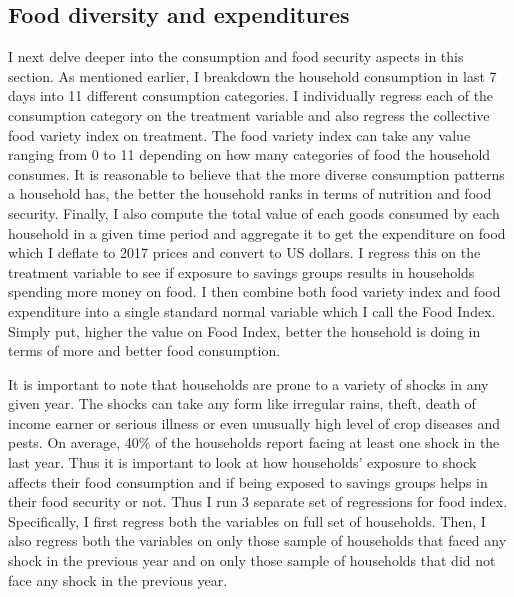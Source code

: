 \documentclass[12pt]{article}
\begin{document}
{\pagebreak
\clearpage

\subsection*{Food diversity and expenditures}\label{sec:regression food}

\hspace{1cm} I next delve deeper into the consumption and food security aspects in this section. As mentioned earlier, I breakdown the household consumption in last 7 days into 11 different consumption categories. I individually regress each of the consumption category on the treatment variable and also regress the collective food variety index on treatment. The food variety index can take any value ranging from 0 to 11 depending on how many categories of food the household consumes. It is reasonable to believe that the more diverse consumption patterns a household has, the better the household ranks in terms of nutrition and food security. Finally, I also compute the total value of each goods consumed by each household in a given time period and aggregate it to get the expenditure on food which I deflate to 2017 prices and convert to US dollars. I regress this on the treatment variable to see if exposure to savings groups results in households spending more money on food. I then combine both food variety index and food expenditure into a single standard normal variable which I call the Food Index. Simply put, higher the value on Food Index, better the household is doing in terms of more and better food consumption.

\hspace{1cm} It is important to note that households are prone to a variety of shocks in any given year. The shocks can take any form like irregular rains, theft, death of income earner or serious illness or even unusually high level of crop diseases and pests. On average, 40\% of the households report facing at least one shock in the last year. Thus it is important to look at how households' exposure to shock affects their food consumption and if being exposed to savings groups helps in their food security or not. Thus I run 3 separate set of regressions for food index. Specifically, I first regress both the variables on full set of households. Then, I also regress both the variables on only those sample of households that faced any shock in the previous year and on only those sample of households that did not face any shock in the previous year.

}
\end{document}
